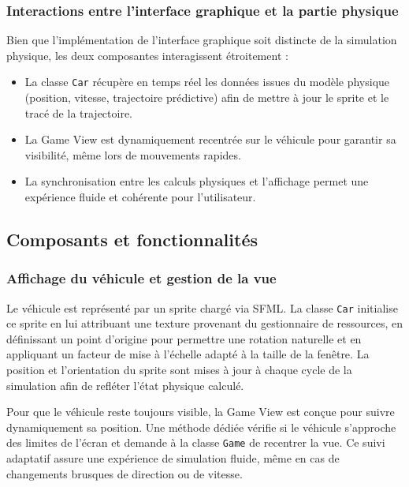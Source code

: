 \label{subsubsubsec:la-police-d-ecriture}

\subsubsection{Interactions entre l'interface graphique et la partie physique}\label{subsubsec:interactions-entre-l-interface-graphique-et-la-partie-physique}
Bien que l'implémentation de l'interface graphique soit distincte de la simulation physique, les deux composantes interagissent étroitement :
\begin{itemize}
    \item La classe \texttt{Car} récupère en temps réel les données issues du modèle physique (position, vitesse, trajectoire prédictive) afin de mettre à jour le sprite et le tracé de la trajectoire.
    \item La Game View est dynamiquement recentrée sur le véhicule pour garantir sa visibilité, même lors de mouvements rapides.
    \item La synchronisation entre les calculs physiques et l'affichage permet une expérience fluide et cohérente pour l'utilisateur.
\end{itemize}

\subsection{Composants et fonctionnalités}\label{subsec:composants-et-fonctionnalites}

\subsubsection{Affichage du véhicule et gestion de la vue}\label{subsubsec:affichage-du-vehicule-et-gestion-de-la-vue}

\label{subsubsubsec:rendu-du-sprite-du-vehicule}
Le véhicule est représenté par un sprite chargé via SFML. La classe \texttt{Car} initialise ce sprite en lui attribuant une texture provenant du gestionnaire de ressources, en définissant un point d'origine pour permettre une rotation naturelle et en appliquant un facteur de mise à l'échelle adapté à la taille de la fenêtre.
La position et l'orientation du sprite sont mises à jour à chaque cycle de la simulation afin de refléter l'état physique calculé.

\label{subsubsubsec:suivi-du-vehicule}
Pour que le véhicule reste toujours visible, la Game View est conçue pour suivre dynamiquement sa position.
Une méthode dédiée vérifie si le véhicule s'approche des limites de l'écran et demande à la classe \texttt{Game} de recentrer la vue.
Ce suivi adaptatif assure une expérience de simulation fluide, même en cas de changements brusques de direction ou de vitesse.

